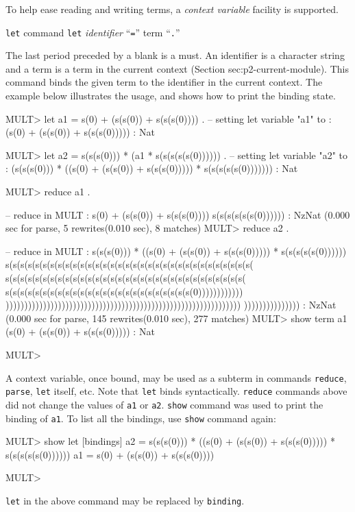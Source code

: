 \documentclass[a4paper]{memoir}
\begin{document}
To help ease reading and writing terms, a {\em context variable}
 facility is supported.

\begin{bsyntax} \texttt{let} command  \Hline
\texttt{let} \textit{identifier} ``\texttt{=}'' term ``\texttt{.}''
\end{bsyntax}

The last period preceded by a blank is a must. An identifier
is a character string and a term is a term in the current context
(Section {sec:p2-current-module}).
This command binds the given term to the identifier in the current
context. The example below illustrates the usage, and shows how
to print the binding state.
\begin{vvtm}
\begin{ccode}
  MULT> let a1 = s(0) + (s(s(0)) + s(s(s(0)))) .
  -- setting let variable "a1" to :
      (s(0) + (s(s(0)) + s(s(s(0))))) : Nat

  MULT> let a2 = s(s(s(0))) * (a1 * s(s(s(s(s(0)))))) .
  -- setting let variable "a2" to :
      (s(s(s(0))) * ((s(0) + (s(s(0)) + s(s(s(0))))) * s(s(s(s(s(0)))))))
       : Nat

  MULT> reduce a1 .

  -- reduce in MULT : s(0) + (s(s(0)) + s(s(s(0))))
  s(s(s(s(s(s(0)))))) : NzNat
  (0.000 sec for parse, 5 rewrites(0.010 sec), 8 matches)
  MULT> reduce a2 .


  -- reduce in MULT : s(s(s(0))) * ((s(0) + (s(s(0)) + s(s(s(0)))))
       * s(s(s(s(s(0))))))
  s(s(s(s(s(s(s(s(s(s(s(s(s(s(s(s(s(s(s(s(s(s(s(s(s(s(s(s(s(s(s(s(s(
    s(s(s(s(s(s(s(s(s(s(s(s(s(s(s(s(s(s(s(s(s(s(s(s(s(s(s(s(s(s(s(s(
    s(s(s(s(s(s(s(s(s(s(s(s(s(s(s(s(s(s(s(s(s(s(s(s(s(0))))))))))))
    )))))))))))))))))))))))))))))))))))))))))))))))))))))))))))))))
    ))))))))))))))) : NzNat
  (0.000 sec for parse, 145 rewrites(0.010 sec), 277 matches)
  MULT> show term a1
  (s(0) + (s(s(0)) + s(s(s(0))))) : Nat

  MULT> 
\end{ccode}
\end{vvtm}
A context variable, once bound, may be used as a subterm in
commands \verb|reduce|, \verb|parse|, \verb|let| itself, etc.
Note that \verb|let| binds syntactically.
\verb|reduce| commands above did not change the values of
\verb|a1| or \verb|a2|. \verb|show| command was used to
print the binding of \verb|a1|. To list all the bindings, use
\verb|show| command again:
\begin{vvtm}
\begin{ccode}
  MULT> show let
  [bindings] 
  a2 = s(s(s(0))) * ((s(0) + (s(s(0)) + s(s(s(0))))) * s(s(s(s(s(0))))))
  a1 = s(0) + (s(s(0)) + s(s(s(0))))

  MULT> 
\end{ccode}
\end{vvtm}
\verb|let| in the above command may be replaced by \verb|binding|.
\end{document}

